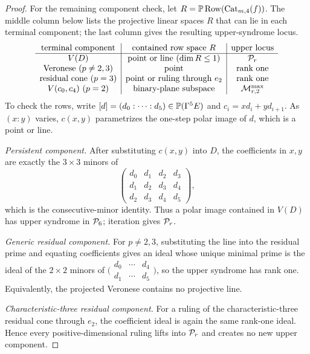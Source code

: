 \begin{proof}
For the remaining component check, let
\(R=\mathbb P\operatorname{Row}(\operatorname{Cat}_{m,4}(f))\).  The middle column
below lists the projective linear spaces \(R\) that can lie in each terminal
component; the last column gives the resulting upper-syndrome locus.
\[
\begin{array}{c|c|c}
\text{terminal component}&\text{contained row space }R&\text{upper locus}\\ \hline
V(D)&\text{point or line }(\dim R\leq1)&\mathcal P_r\\
\text{Veronese }(p\ne2,3)&\text{point}&\text{rank one}\\
\text{residual cone }(p=3)&\text{point or ruling through }e_2&\text{rank one}\\
V(c_0,c_4)\ (p=2)&\text{binary-plane subspace}&
   \mathcal M^{\max}_{r,2}
\end{array}
\]
To check the rows, write
\([d]=(d_0:\cdots:d_5)\in\mathbb P(\Gamma^5E)\) and
\(c_i=xd_i+yd_{i+1}\).  As \((x:y)\) varies, \(c(x,y)\) parametrizes the
one-step polar image of \(d\), which is a point or line.

\emph{Persistent component.}
After substituting \(c(x,y)\) into \(D\), the coefficients in \(x,y\) are
exactly the \(3\times3\) minors of
\[
 \begin{pmatrix}d_0&d_1&d_2&d_3\\d_1&d_2&d_3&d_4\\
 d_2&d_3&d_4&d_5\end{pmatrix},
\]
which is the consecutive-minor identity.  Thus a polar image contained in
\(V(D)\) has upper syndrome in \(\mathcal P_6\); iteration gives \(\mathcal P_r\).

\emph{Generic residual component.}
For \(p\ne2,3\), substituting the line into the residual prime and equating
coefficients gives an ideal whose unique minimal prime is the ideal of the
\(2\times2\) minors of
\(\bigl(\begin{smallmatrix}d_0&\cdots&d_4\\d_1&\cdots&d_5\end{smallmatrix}\bigr)\),
so the upper syndrome has rank one.  Equivalently, the projected Veronese
contains no projective line.

\emph{Characteristic-three residual component.}
For a ruling of the characteristic-three residual cone through \(e_2\), the
coefficient ideal is again
the same rank-one ideal.  Hence every positive-dimensional ruling lifts into
\(\mathcal P_r\) and creates no new upper component.


\end{proof}
